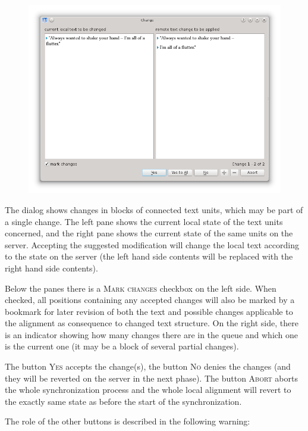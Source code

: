 \documentclass[a4paper,10pt,oneside]{book}
\newcommand{\menu}[1]{\textsc{#1}}
\begin{document}
\begin{figure}[htbf]
 \includegraphics[width=\textwidth]{screenshots/change.png}
\end{figure}

The dialog shows changes in blocks of connected text units, which may be part of a single change. The left pane shows the current local state of the text units concerned, and the right pane shows the current state of the same units on the server. Accepting the suggested modification will change the local text according to the state on the server (the left hand side contents will be replaced with the right hand side contents).

Below the panes there is a \menu{Mark changes} checkbox on the left side. When checked, all positions containing any accepted changes will also be marked by a bookmark for later revision of both the text and possible changes applicable to the alignment as consequence to changed text structure. On the right side, there is an indicator showing how many changes there are in the queue and which one is the current one (it may be a block of several partial changes).

The button \menu{Yes} accepts the change(s), the button \menu{No} denies the changes (and they will be reverted on the server in the next phase). The button \menu{Abort} aborts the whole synchronization process and the whole local alignment will revert to the exactly same state as before the start of the synchronization.

The role of the other buttons is described in the following warning:
\end{document}
